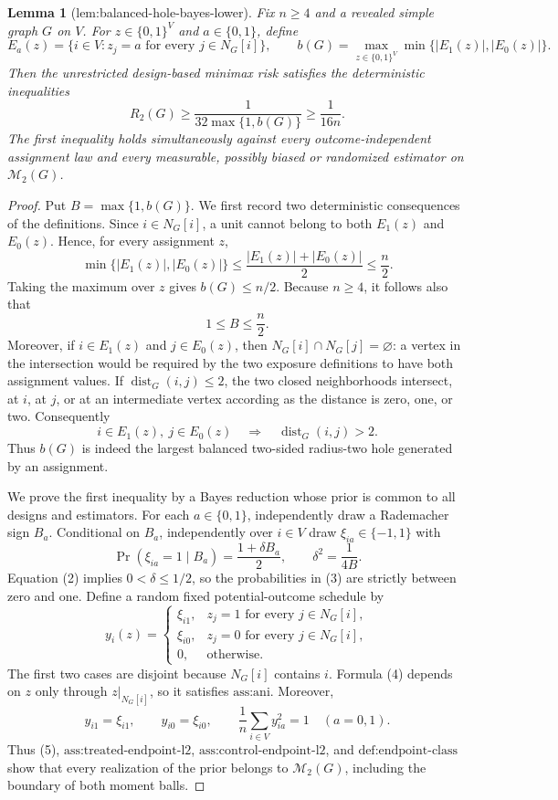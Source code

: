 \documentclass{article}
\newtheorem{lemma}{Lemma}
\begin{document}
\begin{lemma}[lem:balanced-hole-bayes-lower]\label{lem:balanced-hole-bayes-lower}
Fix \(n\ge4\) and a revealed simple graph \(G\) on \(V\).  For \(z\in\{0,1\}^V\) and \(a\in\{0,1\}\), define
\[
E_a(z)=\{i\in V:z_j=a\text{ for every }j\in N_G[i]\},
\qquad
b(G)=\max_{z\in\{0,1\}^V}\min\{|E_1(z)|,|E_0(z)|\}.
\]
Then the unrestricted design-based minimax risk satisfies the deterministic inequalities
\[
R_2(G)\ge \frac{1}{32\max\{1,b(G)\}}\ge \frac{1}{16n}.
\]
The first inequality holds simultaneously against every outcome-independent assignment law and every measurable, possibly biased or randomized estimator on \(\mathcal M_2(G)\).
\end{lemma}
\begin{proof}
Put \(B=\max\{1,b(G)\}\).  We first record two deterministic consequences of the definitions.  Since \(i\in N_G[i]\), a unit cannot belong to both \(E_1(z)\) and \(E_0(z)\).  Hence, for every assignment \(z\),
\[
\min\{|E_1(z)|,|E_0(z)|\}
\le \frac{|E_1(z)|+|E_0(z)|}{2}
\le \frac n2. \tag{1}
\]
Taking the maximum over \(z\) gives \(b(G)\le n/2\).  Because \(n\ge4\), it follows also that
\[
1\le B\le \frac n2. \tag{2}
\]
Moreover, if \(i\in E_1(z)\) and \(j\in E_0(z)\), then \(N_G[i]\cap N_G[j]=\varnothing\): a vertex in the intersection would be required by the two exposure definitions to have both assignment values.  If \(\operatorname{dist}_G(i,j)\le2\), the two closed neighborhoods intersect, at \(i\), at \(j\), or at an intermediate vertex according as the distance is zero, one, or two.  Consequently
\[
i\in E_1(z),\ j\in E_0(z)
\quad\Longrightarrow\quad
\operatorname{dist}_G(i,j)>2. \tag{2a}
\]
Thus \(b(G)\) is indeed the largest balanced two-sided radius-two hole generated by an assignment.

We prove the first inequality by a Bayes reduction whose prior is common to all designs and estimators.  For each \(a\in\{0,1\}\), independently draw a Rademacher sign \(B_a\).  Conditional on \(B_a\), independently over \(i\in V\) draw \(\xi_{ia}\in\{-1,1\}\) with
\[
\Pr(\xi_{ia}=1\mid B_a)=\frac{1+\delta B_a}{2},
\qquad
\delta^2=\frac{1}{4B}. \tag{3}
\]
Equation (2) implies \(0<\delta\le1/2\), so the probabilities in (3) are strictly between zero and one.  Define a random fixed potential-outcome schedule by
\[
y_i(z)=
\begin{cases}
\xi_{i1},&z_j=1\text{ for every }j\in N_G[i],\\
\xi_{i0},&z_j=0\text{ for every }j\in N_G[i],\\
0,&\text{otherwise}.
\end{cases} \tag{4}
\]
The first two cases are disjoint because \(N_G[i]\) contains \(i\).  Formula (4) depends on \(z\) only through \(z|_{N_G[i]}\), so it satisfies \(\text{ass:ani}\).  Moreover,
\[
y_{i1}=\xi_{i1},\qquad y_{i0}=\xi_{i0},
\qquad
\frac1n\sum_{i\in V}y_{ia}^2=1\quad(a=0,1). \tag{5}
\]
Thus (5), \(\text{ass:treated-endpoint-l2}\), \(\text{ass:control-endpoint-l2}\), and \(\text{def:endpoint-class}\) show that every realization of the prior belongs to \(\mathcal M_2(G)\), including the boundary of both moment balls.


\end{proof}
\end{document}
